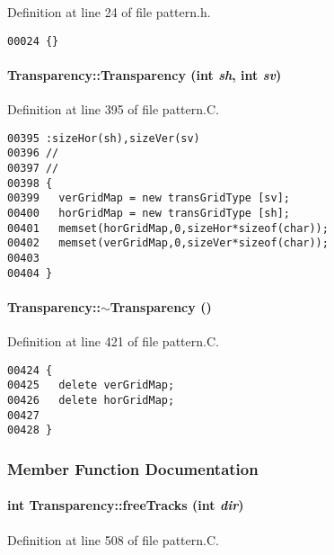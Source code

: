 Definition at line 24 of file pattern.h.\small\begin{verbatim}00024 {}
\end{verbatim}\normalsize 
\label{Transparency_a1}
\paragraph{\setlength{\rightskip}{0pt plus 5cm}Transparency::Transparency (int {\em sh}, int {\em sv})}\hfill



Definition at line 395 of file pattern.C.\small\begin{verbatim}00395 :sizeHor(sh),sizeVer(sv)
00396 //
00397 //
00398 {
00399   verGridMap = new transGridType [sv];
00400   horGridMap = new transGridType [sh];
00401   memset(horGridMap,0,sizeHor*sizeof(char));
00402   memset(verGridMap,0,sizeVer*sizeof(char));
00403 
00404 }
\end{verbatim}\normalsize 
\label{Transparency_a2}
\paragraph{\setlength{\rightskip}{0pt plus 5cm}Transparency::$\sim$Transparency ()}\hfill



Definition at line 421 of file pattern.C.\small\begin{verbatim}00424 {
00425   delete verGridMap;
00426   delete horGridMap;
00427 
00428 }
\end{verbatim}\normalsize 


\subsubsection{Member Function Documentation}
\label{Transparency_a4}
\paragraph{\setlength{\rightskip}{0pt plus 5cm}int Transparency::free\-Tracks (int {\em dir})}\hfill



Definition at line 508 of file pattern.C.

